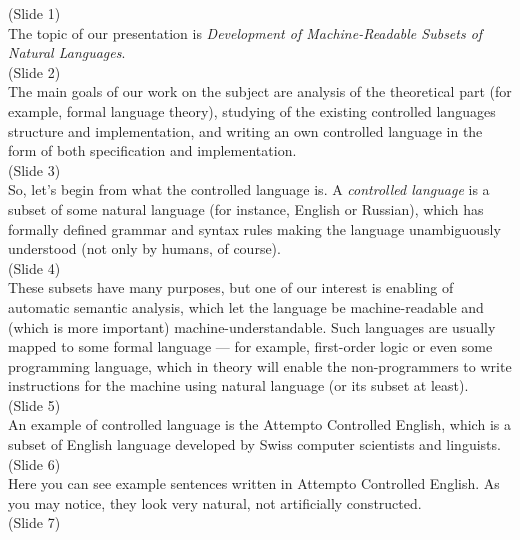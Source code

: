\documentclass{article}
\begin{document}
(Slide 1)\\

The topic of our presentation is \textit{Development of Machine-Readable Subsets of Natural Languages}.\\

(Slide 2)\\

The main goals of our work on the subject are analysis of the theoretical part (for example, formal language theory),
studying of the existing controlled languages structure and implementation, and writing an own controlled language in the
form of both specification and implementation.\\

(Slide 3)\\

So, let's begin from what the controlled language is. A \textit{controlled language} is a subset of some natural language
(for instance, English or Russian), which has formally defined grammar and syntax rules making the language unambiguously
understood (not only by humans, of course).\\

(Slide 4)\\

These subsets have many purposes, but one of our interest is enabling of automatic semantic analysis, which let the language be
machine-readable and (which is more important) machine-understandable. Such languages are usually mapped to some formal language
--- for example, first-order logic or even some programming language, which in theory will enable the non-programmers to write
instructions for the machine using natural language (or its subset at least).\\

(Slide 5)\\

An example of controlled language is the Attempto Controlled English, which is a subset of English language developed by Swiss
computer scientists and linguists.\\

(Slide 6)\\

Here you can see example sentences written in Attempto Controlled English. As you may notice, they look very natural, not
artificially constructed.\\

(Slide 7)\\
\end{document}
